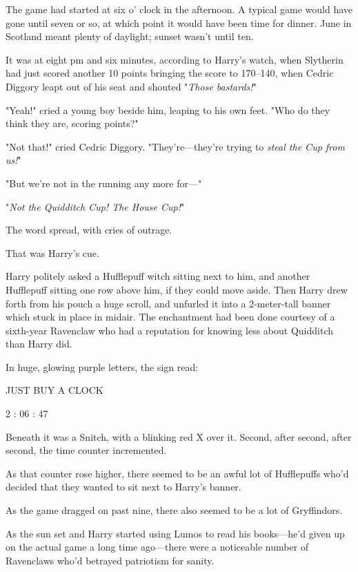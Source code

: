 The game had started at six o' clock in the afternoon. A typical game would 
have gone until seven or so, at which point it would have been time for dinner. 
June in Scotland meant plenty of daylight; sunset wasn't until ten.

It was at eight pm and six minutes, according to Harry's watch, when Slytherin 
had just scored another 10 points bringing the score to 170--{140}, when Cedric 
Diggory leapt out of his seat and shouted "\emph{Those bastards!}"

"Yeah!" cried a young boy beside him, leaping to his own feet. "Who do they 
think they are, scoring points?"

"Not that!" cried Cedric Diggory. "They're---they're trying to \emph{steal the 
Cup from us!}"

"But we're not in the running any more for---"

"\emph{Not the Quidditch Cup! The House Cup!}"

The word spread, with cries of outrage.

That was Harry's cue.

Harry politely asked a Hufflepuff witch sitting next to him, and another 
Hufflepuff sitting one row above him, if they could move aside. Then Harry drew 
forth from his pouch a huge scroll, and unfurled it into a 2-meter-tall banner 
which stuck in place in midair. The enchantment had been done courtesy of a 
sixth-year Ravenclaw who had a reputation for knowing less about Quidditch than 
Harry did.

In huge, glowing purple letters, the sign read:

\begin{center}
JUST BUY A CLOCK

2 : 06 : 47
\end{center}

Beneath it was a Snitch, with a blinking red X over it.
\sbreak
Second, after second, after second, the time counter incremented.

As that counter rose higher, there seemed to be an awful lot of Hufflepuffs 
who'd decided that they wanted to sit next to Harry's banner.

As the game dragged on past nine, there also seemed to be a lot of Gryffindors.

As the sun set and Harry started using Lumos to read his books---he'd given up 
on the actual game a long time ago---there were a noticeable number of 
Ravenclaws who'd betrayed patriotism for sanity.

